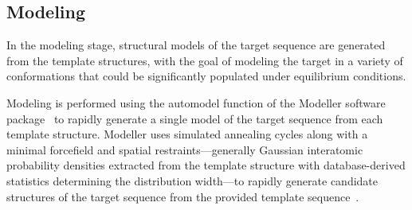 \documentclass[aps,pre,twocolumn,nofootinbib,superscriptaddress,linenumbers]{revtex4-1}
\begin{document}

\subsection{Modeling}

In the modeling stage, structural models of the target sequence are generated from the template structures, with the goal of modeling the target in a variety of conformations that could be significantly populated under equilibrium conditions.

Modeling is performed using the automodel function of the Modeller software package~\cite{fiser:prot-sci:2000:modeller,sali:jmb:1993:modeller} to rapidly generate a single model of the target sequence from each template structure.
Modeller uses simulated annealing cycles along with a minimal forcefield and spatial restraints---generally Gaussian interatomic probability densities extracted from the template structure with database-derived statistics determining the distribution width---to rapidly generate candidate structures of the target sequence from the provided template sequence~\cite{fiser:prot-sci:2000:modeller,sali:jmb:1993:modeller}.
\end{document}
